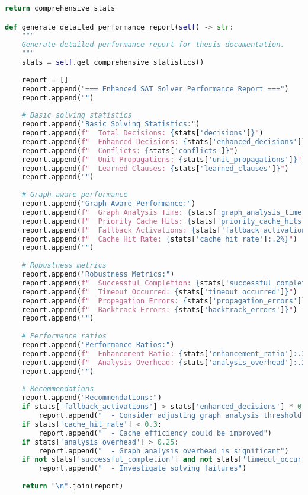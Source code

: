 \begin{lstlisting}[language=Python, caption=Comprehensive Performance Monitoring Infrastructure]
    return comprehensive_stats

def generate_detailed_performance_report(self) -> str:
    """
    Generate detailed performance report for thesis documentation.
    """
    stats = self.get_comprehensive_statistics()
    
    report = []
    report.append("=== Enhanced SAT Solver Performance Report ===")
    report.append("")
    
    # Basic solving statistics
    report.append("Basic Solving Statistics:")
    report.append(f"  Total Decisions: {stats['decisions']}")
    report.append(f"  Enhanced Decisions: {stats['enhanced_decisions']}")
    report.append(f"  Conflicts: {stats['conflicts']}")
    report.append(f"  Unit Propagations: {stats['unit_propagations']}")
    report.append(f"  Learned Clauses: {stats['learned_clauses']}")
    report.append("")
    
    # Graph-aware performance
    report.append("Graph-Aware Performance:")
    report.append(f"  Graph Analysis Time: {stats['graph_analysis_time']:.3f}s")
    report.append(f"  Priority Cache Hits: {stats['priority_cache_hits']}")
    report.append(f"  Fallback Activations: {stats['fallback_activations']}")
    report.append(f"  Cache Hit Rate: {stats['cache_hit_rate']:.2%}")
    report.append("")
    
    # Robustness metrics
    report.append("Robustness Metrics:")
    report.append(f"  Successful Completion: {stats['successful_completion']}")
    report.append(f"  Timeout Occurred: {stats['timeout_occurred']}")
    report.append(f"  Propagation Errors: {stats['propagation_errors']}")
    report.append(f"  Backtrack Errors: {stats['backtrack_errors']}")
    report.append("")
    
    # Performance ratios
    report.append("Performance Ratios:")
    report.append(f"  Enhancement Ratio: {stats['enhancement_ratio']:.2%}")
    report.append(f"  Analysis Overhead: {stats['analysis_overhead']:.2%}")
    report.append("")
    
    # Recommendations
    report.append("Recommendations:")
    if stats['fallback_activations'] > stats['enhanced_decisions'] * 0.2:
        report.append("  - Consider adjusting graph analysis threshold")
    if stats['cache_hit_rate'] < 0.3:
        report.append("  - Cache efficiency could be improved")
    if stats['analysis_overhead'] > 0.25:
        report.append("  - Graph analysis overhead is significant")
    if not stats['successful_completion'] and not stats['timeout_occurred']:
        report.append("  - Investigate solving failures")
    
    return "\n".join(report)
\end{lstlisting}

